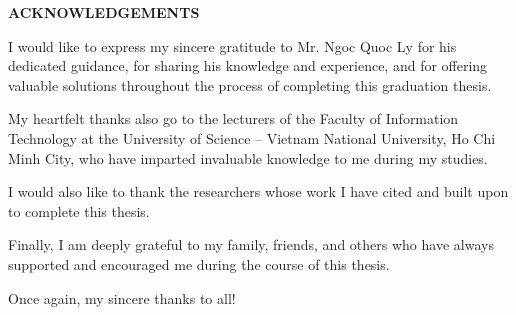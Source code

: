 \vspace{2cm}

{}

{\MakeUppercase\centering\Large\bfseries ACKNOWLEDGEMENTS}

\vspace{2cm}
{
	
	I would like to express my sincere gratitude to Mr. Ngoc Quoc Ly for his dedicated guidance, for sharing his knowledge and experience, and for offering valuable solutions throughout the process of completing this graduation thesis.
	
	My heartfelt thanks also go to the lecturers of the Faculty of Information Technology at the University of Science – Vietnam National University, Ho Chi Minh City, who have imparted invaluable knowledge to me during my studies.
	
	I would also like to thank the researchers whose work I have cited and built upon to complete this thesis.
	
	Finally, I am deeply grateful to my family, friends, and others who have always supported and encouraged me during the course of this thesis.
	
	Once again, my sincere thanks to all!
}

\pagebreak
